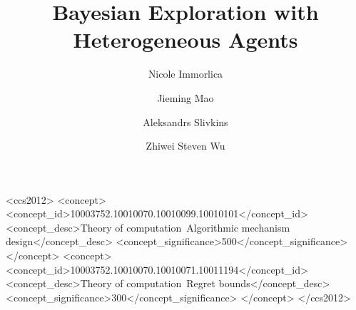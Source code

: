 \documentclass[sigconf]{acmart}
\begin{document}
\title{Bayesian Exploration with Heterogeneous Agents}

\author{Nicole Immorlica}

\author{Jieming Mao}

\author{Aleksandrs Slivkins}

\author{Zhiwei Steven Wu}

\begin{abstract}

\end{abstract}

\begin{CCSXML}
<ccs2012>
<concept>
<concept_id>10003752.10010070.10010099.10010101</concept_id>
<concept_desc>Theory of computation~Algorithmic mechanism design</concept_desc>
<concept_significance>500</concept_significance>
</concept>
<concept>
<concept_id>10003752.10010070.10010071.10011194</concept_id>
<concept_desc>Theory of computation~Regret bounds</concept_desc>
<concept_significance>300</concept_significance>
</concept>
</ccs2012>
\end{CCSXML}


%

\maketitle















\appendix




\end{document}
